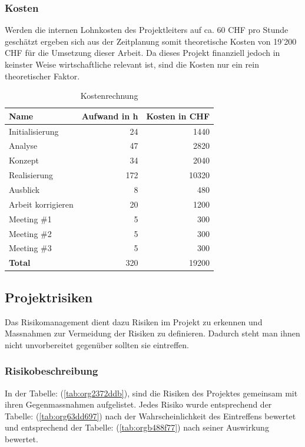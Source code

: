 \subsubsection{Kosten}
\label{sec:org0dbd731}

Werden die internen Lohnkosten des Projektleiters auf ca. 60 CHF pro Stunde
geschätzt ergeben sich aus der Zeitplanung somit theoretische Kosten von 19'200
CHF für die Umsetzung dieser Arbeit. Da dieses Projekt finanziell jedoch in
keinster Weise wirtschaftliche relevant ist, sind die Kosten nur ein rein
theoretischer Faktor.
\begin{table}[htbp]
\centering
\begin{tabular}{lrr}
\hline
\textbf{Name}\cellcolor[HTML]{C0C0C0} & \textbf{Aufwand in h}\cellcolor[HTML]{C0C0C0} & \textbf{Kosten in CHF}\cellcolor[HTML]{C0C0C0}\\
\hline
Initialisierung & 24 & 1440\\
Analyse & 47 & 2820\\
Konzept & 34 & 2040\\
Realisierung & 172 & 10320\\
Ausblick & 8 & 480\\
Arbeit korrigieren & 20 & 1200\\
Meeting \#1 & 5 & 300\\
Meeting \#2 & 5 & 300\\
Meeting \#3 & 5 & 300\\
\hline
\textbf{Total} & 320 & 19200\\
\hline
\end{tabular}
\caption{\label{tab:orga39f1c0}
Kostenrechnung}

\end{table}

\subsection{Projektrisiken}
\label{sec:org77d2db2}

Das Risikomanagement dient dazu Risiken im Projekt zu erkennen und Massnahmen
zur Vermeidung der Risiken zu definieren. Dadurch steht man ihnen nicht
unvorbereitet gegenüber sollten sie eintreffen.

\subsubsection{Risikobeschreibung}
\label{sec:org1b0ce60}

In der Tabelle: (\ref{tab:org2372ddb}), sind die Risiken des Projektes
gemeinsam mit ihren Gegenmassnahmen aufgelistet. Jedes Risiko wurde
entsprechend der Tabelle: (\ref{tab:org63dd697}) nach der Wahrscheinlichkeit
des Eintreffens bewertet und entsprechend der Tabelle: (\ref{tab:orgb488f77}) nach
seiner Auswirkung bewertet.

